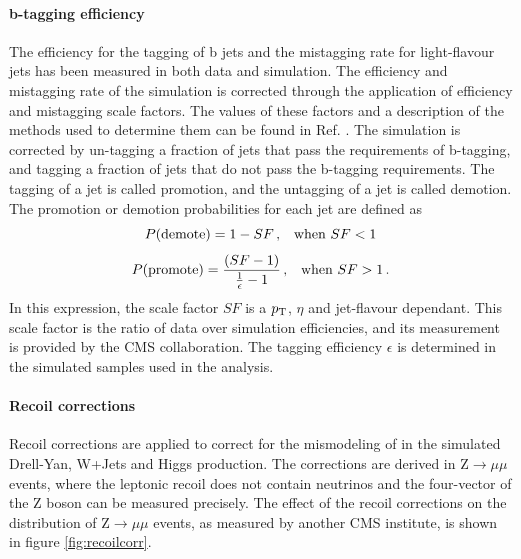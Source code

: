 \paragraph{b-tagging efficiency} The efficiency for the tagging of b jets and the mistagging rate for light-flavour jets has been measured in both data and simulation. The efficiency and mistagging rate of the simulation is corrected through the application of efficiency and mistagging scale factors. The values of these factors and a description of the methods used to determine them can be found in Ref. \cite{Sirunyan_2018}. The simulation is corrected by un-tagging a fraction of jets that pass the requirements of b-tagging, and tagging a fraction of jets that do not pass the b-tagging requirements. The tagging of a jet is called promotion, and the untagging of a jet is called demotion. The promotion or demotion probabilities for each jet are defined as
\begin{equation*}
    P(\mathrm{demote}) = 1 - SF \msep \text{when } SF < 1
\end{equation*}
\begin{equation*}
    P(\mathrm{promote}) = \frac{(SF-1)}{\frac{1}{\epsilon}-1} \msep \text{when } SF > 1 \mend
\end{equation*}
In this expression, the scale factor $SF$ is a $p_{\mathrm{T}}$, $\eta$ and jet-flavour dependant. This scale factor is the ratio of data over simulation efficiencies, and its measurement is provided by the CMS collaboration. The tagging efficiency $\epsilon$ is determined in the simulated samples used in the analysis.


\paragraph{Recoil corrections} Recoil corrections are applied to correct for the mismodeling of \MET in the simulated Drell-Yan, W+Jets and Higgs production. The corrections are derived in $\mathrm{Z}\rightarrow \mu\mu$ events, where the leptonic recoil does not contain neutrinos and the four-vector of the Z boson can be measured precisely. The effect of the recoil corrections on the \MET distribution of $\mathrm{Z}\rightarrow \mu\mu$ events, as measured by another CMS institute, is shown in figure \ref{fig:recoilcorr}.

